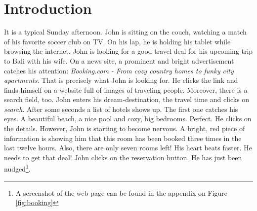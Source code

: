 \section{Introduction}
It is a typical Sunday afternoon. John is sitting on the couch, watching a match of his favorite soccer club on TV. On his lap, he is holding his tablet while browsing the internet. John is looking for a good travel deal for his upcoming trip to Bali with his wife. On a news site, a prominent and bright advertisement catches his attention: \textit{Booking.com - From cozy country homes to funky city apartments}. That is precisely what John is looking for. He clicks the link and finds himself on a website full of images of traveling people. Moreover, there is a search field, too. John enters his dream-destination, the travel time and clicks on \textit{search}. After some seconds a list of hotels shows up. The first one catches his eyes. A beautiful beach, a nice pool and cozy, big bedrooms. Perfect. He clicks on the details. However,  John is starting to become nervous. A bright, red piece of information is showing him that this room has been booked three times in the last twelve hours. Also, there are only seven rooms left! His heart beats faster. He needs to get that deal! John clicks on the reservation button. He has just been nudged\footnote{A screenshot of the web page can be found in the appendix on Figure \ref{fig:booking}}.
\\

